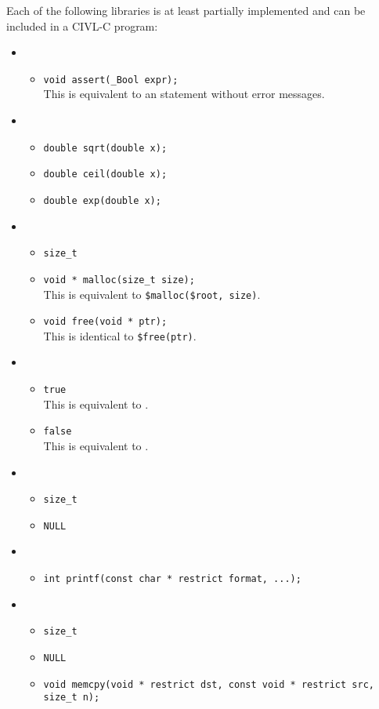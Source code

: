 Each of the following libraries is at least partially implemented and can
be included in a CIVL-C program:
\begin{itemize}
\item {}
  \begin{itemize}
  \item \verb!void assert(_Bool expr);!\\This is equivalent to an \cassert{} statement without error messages.
  \end{itemize}
\item {}
  \begin{itemize}
  \item \verb!double sqrt(double x);!
  \item \verb!double ceil(double x);!
  \item \verb!double exp(double x);!
  \end{itemize}
\item {}
  \begin{itemize}
  \item \verb!size_t!
  \item \verb!void * malloc(size_t size);!\\
  This is equivalent to \verb!$malloc($root, size)!.
  \item \verb!void free(void * ptr);!\\
  This is identical to \verb!$free(ptr)!.
  \end{itemize}
\item {}
  \begin{itemize}
  \item \verb!true!\\
  This is equivalent to \ctrue.
  \item \verb!false!\\
  This is equivalent to \cfalse.
  \end{itemize}
\item {}
  \begin{itemize}
  \item \verb!size_t!
  \item \verb!NULL!
  \end{itemize}
\item {}
  \begin{itemize}
  \item \verb!int printf(const char * restrict format, ...);!
  \end{itemize}
\item {}
  \begin{itemize}
  \item \verb!size_t!
  \item \verb!NULL!
  \item \verb!void memcpy(void * restrict dst, const void * restrict src, size_t n);!
  \end{itemize}
\end{itemize}
